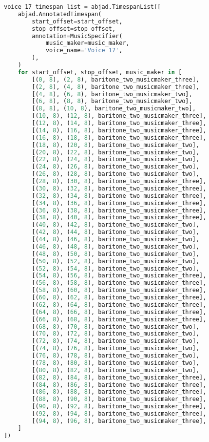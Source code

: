 \begin{lstlisting}[language=Python, caption=Invocation Source Code]
voice_17_timespan_list = abjad.TimespanList([
    abjad.AnnotatedTimespan(
        start_offset=start_offset,
        stop_offset=stop_offset,
        annotation=MusicSpecifier(
            music_maker=music_maker,
            voice_name='Voice 17',
        ),
    )
    for start_offset, stop_offset, music_maker in [
        [(0, 8), (2, 8), baritone_two_musicmaker_three],
        [(2, 8), (4, 8), baritone_two_musicmaker_three],
        [(4, 8), (6, 8), baritone_two_musicmaker_two],
        [(6, 8), (8, 8), baritone_two_musicmaker_two],
        [(8, 8), (10, 8), baritone_two_musicmaker_two],
        [(10, 8), (12, 8), baritone_two_musicmaker_three],
        [(12, 8), (14, 8), baritone_two_musicmaker_three],
        [(14, 8), (16, 8), baritone_two_musicmaker_three],
        [(16, 8), (18, 8), baritone_two_musicmaker_three],
        [(18, 8), (20, 8), baritone_two_musicmaker_two],
        [(20, 8), (22, 8), baritone_two_musicmaker_two],
        [(22, 8), (24, 8), baritone_two_musicmaker_two],
        [(24, 8), (26, 8), baritone_two_musicmaker_two],
        [(26, 8), (28, 8), baritone_two_musicmaker_two],
        [(28, 8), (30, 8), baritone_two_musicmaker_three],
        [(30, 8), (32, 8), baritone_two_musicmaker_three],
        [(32, 8), (34, 8), baritone_two_musicmaker_three],
        [(34, 8), (36, 8), baritone_two_musicmaker_three],
        [(36, 8), (38, 8), baritone_two_musicmaker_three],
        [(38, 8), (40, 8), baritone_two_musicmaker_three],
        [(40, 8), (42, 8), baritone_two_musicmaker_two],
        [(42, 8), (44, 8), baritone_two_musicmaker_two],
        [(44, 8), (46, 8), baritone_two_musicmaker_two],
        [(46, 8), (48, 8), baritone_two_musicmaker_two],
        [(48, 8), (50, 8), baritone_two_musicmaker_two],
        [(50, 8), (52, 8), baritone_two_musicmaker_two],
        [(52, 8), (54, 8), baritone_two_musicmaker_two],
        [(54, 8), (56, 8), baritone_two_musicmaker_three],
        [(56, 8), (58, 8), baritone_two_musicmaker_three],
        [(58, 8), (60, 8), baritone_two_musicmaker_three],
        [(60, 8), (62, 8), baritone_two_musicmaker_three],
        [(62, 8), (64, 8), baritone_two_musicmaker_three],
        [(64, 8), (66, 8), baritone_two_musicmaker_three],
        [(66, 8), (68, 8), baritone_two_musicmaker_three],
        [(68, 8), (70, 8), baritone_two_musicmaker_two],
        [(70, 8), (72, 8), baritone_two_musicmaker_two],
        [(72, 8), (74, 8), baritone_two_musicmaker_two],
        [(74, 8), (76, 8), baritone_two_musicmaker_two],
        [(76, 8), (78, 8), baritone_two_musicmaker_two],
        [(78, 8), (80, 8), baritone_two_musicmaker_two],
        [(80, 8), (82, 8), baritone_two_musicmaker_two],
        [(82, 8), (84, 8), baritone_two_musicmaker_three],
        [(84, 8), (86, 8), baritone_two_musicmaker_three],
        [(86, 8), (88, 8), baritone_two_musicmaker_three],
        [(88, 8), (90, 8), baritone_two_musicmaker_three],
        [(90, 8), (92, 8), baritone_two_musicmaker_three],
        [(92, 8), (94, 8), baritone_two_musicmaker_three],
        [(94, 8), (96, 8), baritone_two_musicmaker_three],
    ]
])


\end{lstlisting}
